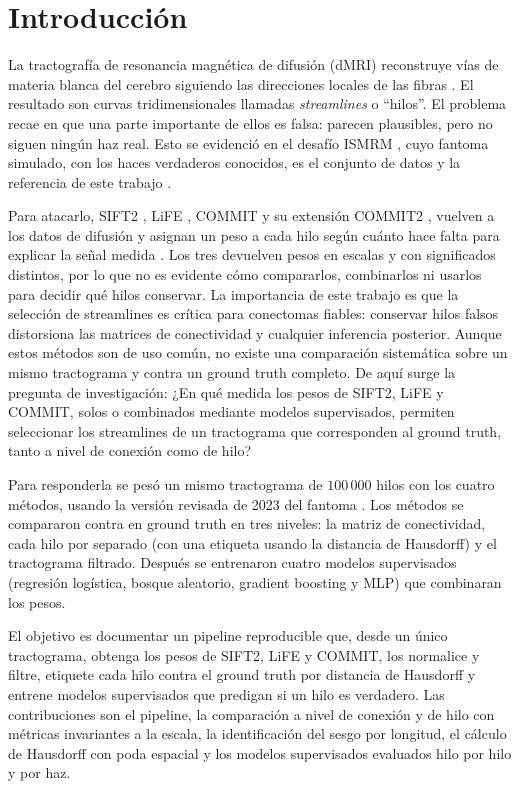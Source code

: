 \documentclass[11pt,a4paper]{article}
\begin{document}
\section{Introducción}

La tractografía de resonancia magnética de difusión (dMRI) reconstruye vías de materia blanca del cerebro siguiendo las direcciones locales de las fibras \cite{ismrm2015data}. El resultado son curvas tridimensionales llamadas \textit{streamlines} o “hilos”. El problema recae en que una parte importante de ellos es falsa: parecen plausibles, pero no siguen ningún haz real. Esto se evidenció en el desafío ISMRM \cite{ismrm2015data}, cuyo fantoma simulado, con los haces verdaderos conocidos, es el conjunto de datos y la referencia de este trabajo \cite{daducci2015amico}.

Para atacarlo, SIFT2 \cite{smith2015}, LiFE \cite{pestilli2014}, COMMIT \cite{daducci2015} y su extensión COMMIT2 \cite{schiavi2020commit2}, vuelven a los datos de difusión y asignan un peso a cada hilo según cuánto hace falta para explicar la señal medida \cite{schiavi2020}. Los tres devuelven pesos en escalas y con significados distintos, por lo que no es evidente cómo compararlos, combinarlos ni usarlos para decidir qué hilos conservar. La importancia de este trabajo es que la selección de streamlines es crítica para conectomas fiables: conservar hilos falsos distorsiona las matrices de conectividad y cualquier inferencia posterior. Aunque estos métodos son de uso común, no existe una comparación sistemática sobre un mismo tractograma y contra un ground truth completo. De aquí surge la pregunta de investigación: ¿En qué medida los pesos de SIFT2, LiFE y COMMIT, solos o combinados mediante modelos supervisados, permiten seleccionar los streamlines de un tractograma que corresponden al ground truth, tanto a nivel de conexión como de hilo?

Para responderla se pesó un mismo tractograma de $100\,000$ hilos con los cuatro métodos, usando la versión revisada de 2023 del fantoma \cite{daducci2015amico}. Los métodos se compararon contra en ground truth en tres niveles: la matriz de conectividad, cada hilo por separado (con una etiqueta usando la distancia de Hausdorff) y el tractograma filtrado.
Después se entrenaron cuatro modelos supervisados (regresión logística, bosque aleatorio, gradient boosting y MLP) que combinaran los pesos. 

El objetivo es documentar un pipeline reproducible que, desde un único tractograma, obtenga los pesos de SIFT2, LiFE y COMMIT, los normalice y filtre, etiquete cada hilo contra el ground truth por distancia de Hausdorff y entrene modelos supervisados que predigan si un hilo es verdadero. Las contribuciones son el pipeline, la comparación a nivel de conexión y de hilo con métricas invariantes a la escala, la identificación del sesgo por longitud, el cálculo de Hausdorff con poda espacial y los modelos supervisados evaluados hilo por hilo y por haz.
\end{document}
